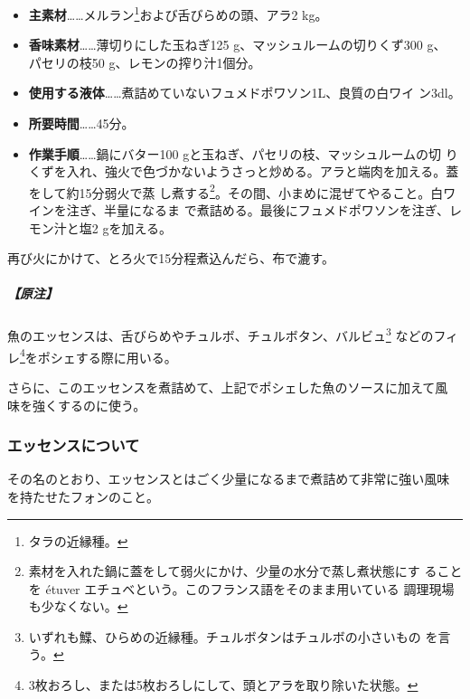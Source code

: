 \begin{recette}
\begin{itemize}
\item
  \textbf{主素材}\ldots{}\ldots{}メルラン\footnote{タラの近縁種。}および舌びらめの頭、アラ2
  kg。
\item
  \textbf{香味素材}\ldots{}\ldots{}薄切りにした玉ねぎ125
  g、マッシュルームの切りくず300 g、 パセリの枝50
  g、レモンの搾り汁1個分。
\item
  \textbf{使用する液体}\ldots{}\ldots{}煮詰めていないフュメドポワソン1\undemi{}L、良質の白ワイ
  ン3dl。
\item
  \textbf{所要時間}\ldots{}\ldots{}45分。
\item
  \textbf{作業手順}\ldots{}\ldots{}鍋にバター100
  gと玉ねぎ、パセリの枝、マッシュルームの切
  りくずを入れ、強火で色づかないようさっと炒める。アラと端肉を加える。蓋をして約15分弱火で蒸
  し煮する\footnote{素材を入れた鍋に蓋をして弱火にかけ、少量の水分で蒸し煮状態にす
    ることを étuver エチュベという。このフランス語をそのまま用いている
    調理現場も少なくない。}。その間、小まめに混ぜてやること。白ワインを注ぎ、半量になるま
  で煮詰める。最後にフュメドポワソンを注ぎ、レモン汁と塩2 gを加える。
\end{itemize}

再び火にかけて、とろ火で15分程煮込んだら、布で漉す。

\hypertarget{nota-essence-de-poisson}{%
\subparagraph{【原注】}\label{nota-essence-de-poisson}}

魚のエッセンスは、舌びらめやチュルボ、チュルボタン、バルビュ\footnote{いずれも鰈、ひらめの近縁種。チュルボタンはチュルボの小さいもの
  を言う。} などのフィレ\footnote{3枚おろし、または5枚おろしにして、頭とアラを取り除いた状態。}をポシェする際に用いる。

さらに、このエッセンスを煮詰めて、上記でポシェした魚のソースに加えて風
味を強くするのに使う。

\maeaki

\hypertarget{essences-diverses}{%
\subsubsection{エッセンスについて}\label{essences-diverses}}



その名のとおり、エッセンスとはごく少量になるまで煮詰めて非常に強い風味
を持たせたフォンのこと。


\end{recette}

